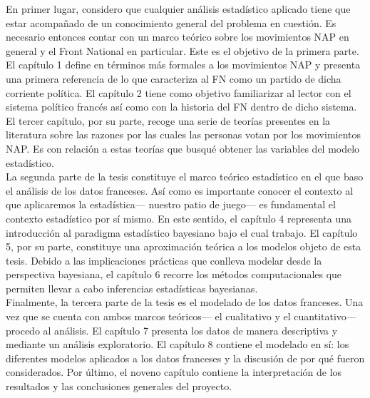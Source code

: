En primer lugar, considero que cualquier análisis estadístico aplicado tiene que estar acompañado de un conocimiento general del problema en cuestión. Es necesario entonces contar con un marco teórico sobre los movimientos NAP en general y el Front National en particular. Este es el objetivo de la primera parte. El capítulo 1 define en términos más formales a los movimientos NAP y presenta una primera referencia de lo que caracteriza al FN como un partido de dicha corriente política. El capítulo 2 tiene como objetivo familiarizar al lector con el sistema político francés así como con la historia del FN dentro de dicho sistema. El tercer capítulo, por su parte, recoge una serie de teorías presentes en la literatura sobre las razones por las cuales las personas votan por los movimientos NAP. Es con relación a estas teorías que busqué obtener las variables del modelo estadístico.\\

La segunda parte de la tesis constituye el marco teórico estadístico en el que baso el análisis de los datos franceses. Así como es importante conocer el contexto al que aplicaremos la estadística--- nuestro patio de juego--- es fundamental el contexto estadístico por sí mismo. En este sentido, el capítulo 4 representa una introducción al paradigma estadístico bayesiano bajo el cual trabajo. El capítulo 5, por su parte, constituye una aproximación teórica a los modelos objeto de esta tesis. Debido a las implicaciones prácticas que conlleva modelar desde la perspectiva bayesiana, el capítulo 6 recorre los métodos computacionales que permiten llevar a cabo inferencias estadísticas bayesianas.\\

Finalmente, la tercera parte de la tesis es el modelado de los datos franceses. Una vez que se cuenta con ambos marcos teóricos--- el cualitativo y el cuantitativo--- procedo al análisis. El capítulo 7 presenta los datos de manera descriptiva y mediante un análisis exploratorio. El capítulo 8 contiene el modelado en sí: los diferentes modelos aplicados a los datos franceses y la discusión de por qué fueron considerados. Por último, el noveno capítulo contiene la interpretación de los resultados y las conclusiones generales del proyecto. 

